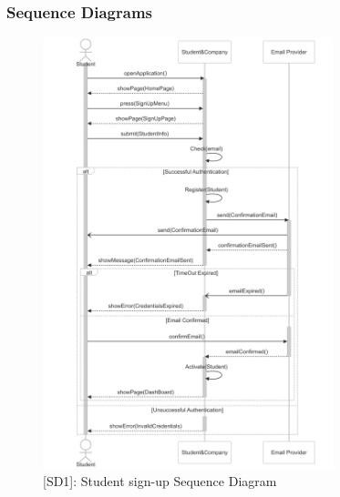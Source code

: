 \subsubsection{Sequence Diagrams}
\begin{figure}[H]
    \centering
    \includegraphics[width=0.75\textwidth]{Latex/Images/StudentSignUpSequenceDiagram.png}
    \caption{[SD1]: Student sign-up Sequence Diagram}
    \label{fig:SD1}
\end{figure}
\clearpage

